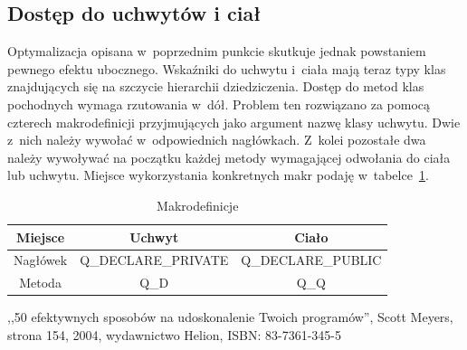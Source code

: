 \documentclass[11pt,twoside,a4paper,final]{llncs}
\begin{document}
\subsection{Dostęp do uchwytów i ciał}
Optymalizacja opisana w~poprzednim punkcie skutkuje jednak powstaniem pewnego efektu ubocznego.
Wskaźniki do uchwytu i~ciała mają teraz typy klas znajdujących się na szczycie hierarchii dziedziczenia. Dostęp do metod klas pochodnych wymaga rzutowania w~dół. 
Problem ten rozwiązano za pomocą czterech makrodefinicji przyjmujących jako argument nazwę klasy uchwytu. Dwie z~nich należy wywołać w~odpowiednich nagłówkach. Z~kolei pozostałe dwa należy wywoływać na początku każdej metody wymagającej odwołania do ciała lub uchwytu. Miejsce wykorzystania konkretnych makr podaję w~tabelce~\ref{tab:makra}.

\begin{table}[h]\footnotesize
  	\caption{Makrodefinicje}
	\label{tab:makra}
	\begin{tabular}{|c|c|c|}
	\hline
	Miejsce & Uchwyt & Ciało\\
	\hline
	Nagłówek & Q\_DECLARE\_PRIVATE & Q\_DECLARE\_PUBLIC\\
	\hline
	Metoda & Q\_D & Q\_Q\\
	\hline
	\end{tabular}
\end{table}

\begin{thebibliography}{}
,,50 efektywnych sposobów na udoskonalenie Twoich programów'', Scott Meyers, strona 154, 2004, wydawnictwo Helion, ISBN: 83-7361-345-5


\end{thebibliography}
\end{document}
